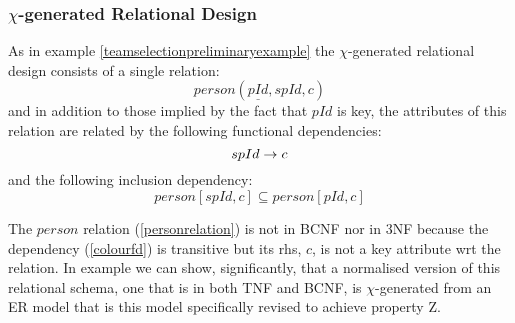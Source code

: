 \subsubsection{$\chi$-generated Relational Design}
As in example \ref{teamselectionpreliminaryexample} the $\chi$-generated relational design consists of a single relation:
\begin{equation}
\label{personrelation}
person(\underline{pId}, spId, c)
\end{equation}
and in addition to those implied by the fact that $pId$ is key, the  attributes of this relation are related by the following  functional dependencies:
\begin{equation}
spId \rightarrow c
\end{equation}
and the following  inclusion dependency:
\begin{equation}
\label{spIdcolour1}
person[spId,c] \subseteq person[pId,c]
\end{equation}


The $person$ relation (\ref{personrelation}) is not in BCNF nor in 3NF because the dependency (\ref{colourfd}) is transitive but its rhs, $c$, is not a key attribute wrt the relation. 
In example  we can show, significantly,  that a normalised version of this relational schema, one that is in both TNF and BCNF, is 
$\chi$-generated from an ER model that is this  model specifically revised to achieve property Z.



